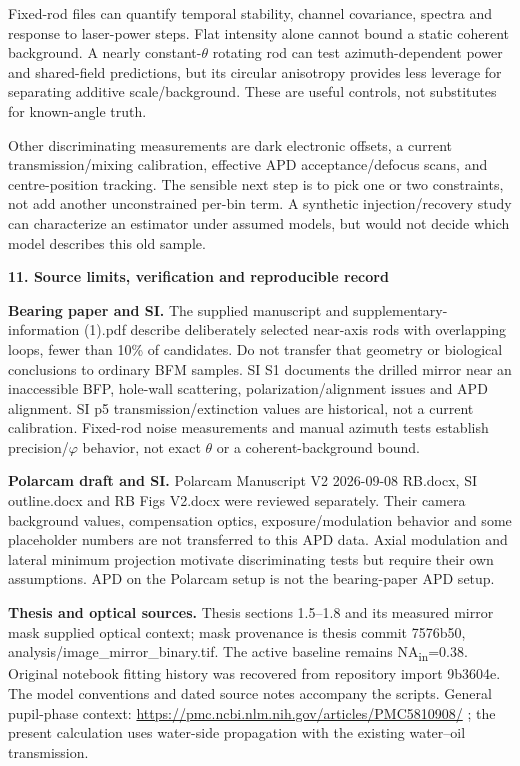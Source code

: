 \documentclass[10pt,a4paper]{article}
\newcommand{\heading}[1]{{\sffamily\Large\bfseries\color{ink}#1}\par\vspace{7pt}}
\begin{document}
Fixed-rod files can quantify temporal stability, channel covariance, spectra and response to laser-power steps. Flat intensity alone cannot bound a static coherent background. A nearly constant-\(θ\) rotating rod can test azimuth-dependent power and shared-field predictions, but its circular anisotropy provides less leverage for separating additive scale/background. These are useful controls, not substitutes for known-angle truth.\par
Other discriminating measurements are dark electronic offsets, a current transmission/mixing calibration, effective APD acceptance/defocus scans, and centre-position tracking. The sensible next step is to pick one or two constraints, not add another unconstrained per-bin term. A synthetic injection/recovery study can characterize an estimator under assumed models, but would not decide which model describes this old sample.\par
\clearpage
\heading{11. Source limits, verification and reproducible record}
\textbf{Bearing paper and SI.} The supplied manuscript and supplementary-information (1).pdf describe deliberately selected near-axis rods with overlapping loops, fewer than 10\% of candidates. Do not transfer that geometry or biological conclusions to ordinary BFM samples. SI S1 documents the drilled mirror near an inaccessible BFP, hole-wall scattering, polarization/alignment issues and APD alignment. SI p5 transmission/extinction values are historical, not a current calibration. Fixed-rod noise measurements and manual azimuth tests establish precision/\(φ\) behavior, not exact \(θ\) or a coherent-background bound.\par
\textbf{Polarcam draft and SI.} Polarcam Manuscript V2 2026-09-08 RB.docx, SI outline.docx and RB Figs V2.docx were reviewed separately. Their camera background values, compensation optics, exposure/modulation behavior and some placeholder numbers are not transferred to this APD data. Axial modulation and lateral minimum projection motivate discriminating tests but require their own assumptions. APD on the Polarcam setup is not the bearing-paper APD setup.\par
\textbf{Thesis and optical sources.} Thesis sections 1.5–1.8 and its measured mirror mask supplied optical context; mask provenance is thesis commit 7576b50, analysis/image\_mirror\_binary.tif. The active baseline remains NA\textsubscript{in}=0.38. Original notebook fitting history was recovered from repository import 9b3604e. The model conventions and dated source notes accompany the scripts. General pupil-phase context: \url{https://pmc.ncbi.nlm.nih.gov/articles/PMC5810908/} ; the present calculation uses water-side propagation with the existing water–oil transmission.\par
\end{document}
